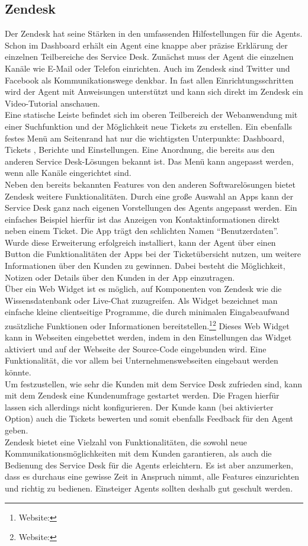 \subsection{Zendesk}
\noindent 
Der Zendesk hat seine Stärken in den umfassenden Hilfestellungen für die Agents. Schon im Dashboard erhält ein Agent eine knappe aber präzise Erklärung der einzelnen Teilbereiche des Service Desk. Zunächst muss der Agent die einzelnen Kanäle wie E-Mail oder Telefon einrichten. Auch im Zendesk sind  Twitter und Facebook als Kommunikationswege denkbar. In fast allen Einrichtungsschritten wird der Agent mit Anweisungen unterstützt und kann sich direkt im Zendesk ein Video-Tutorial anschauen.\\
Eine statische Leiste befindet sich im oberen Teilbereich der Webanwendung mit einer Suchfunktion und der Möglichkeit neue Tickets zu erstellen. Ein ebenfalls festes Menü am Seitenrand hat nur die wichtigsten Unterpunkte: Dashboard, Tickets , Berichte und Einstellungen. Eine Anordnung, die bereits aus den anderen Service Desk-Lösungen bekannt ist. Das Menü kann angepasst werden, wenn alle Kanäle eingerichtet sind.\\
Neben den bereits bekannten Features von den anderen Softwarelösungen bietet Zendesk weitere Funktionalitäten. Durch eine große Auswahl an Apps kann der Service Desk ganz nach eigenen Vorstellungen des Agents angepasst werden. Ein einfaches Beispiel hierfür ist das Anzeigen von Kontaktinformationen direkt neben einem Ticket. Die App trägt den schlichten Namen \enquote{Benutzerdaten}. Wurde diese Erweiterung erfolgreich installiert, kann der Agent über einen Button die Funktionalitäten der Apps bei der Ticketübersicht nutzen,  um weitere Informationen über den Kunden zu gewinnen. Dabei besteht die Möglichkeit, Notizen oder Details über den Kunden in der App einzutragen.\\
Über ein Web Widget ist es möglich, auf Komponenten von Zendesk wie die Wissensdatenbank oder Live-Chat zuzugreifen. Als Widget bezeichnet man einfache kleine clientseitige Programme, die durch minimalen Eingabeaufwand zusätzliche Funktionen oder Informationen bereitstellen.\footnote{Website:\cite{Widget1}}\footnote{Website:\cite{Widget2}} Dieses Web Widget kann in Webseiten eingebettet werden, indem in den Einstellungen das Widget aktiviert und auf der Webseite der Source-Code eingebunden wird. Eine Funktionalität, die vor allem bei Unternehmenswebseiten  eingebaut werden könnte.\\
Um festzustellen, wie sehr die Kunden mit dem Service Desk zufrieden sind, kann mit dem Zendesk eine Kundenumfrage gestartet werden. Die Fragen hierfür lassen sich allerdings nicht konfigurieren. Der Kunde kann (bei aktivierter Option) auch die Tickets bewerten und somit ebenfalls Feedback für den Agent geben.\\
Zendesk bietet eine Vielzahl von Funktionalitäten, die sowohl neue Kommunikationsmöglichkeiten mit dem Kunden garantieren, als auch die Bedienung des Service Desk für die Agents erleichtern. Es ist aber anzumerken, dass es durchaus eine gewisse Zeit in Anspruch nimmt, alle Features einzurichten und richtig zu bedienen. Einsteiger Agents sollten deshalb gut geschult werden.\\


